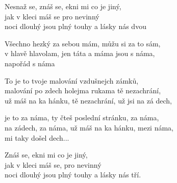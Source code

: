 
\ve{}
Nesnaž se, znáš se, ekni mi  co je jiný,\\
jak v kleci máš se pro nevinný \\
noci dlouhý jsou plný  touhy a lásky nás dvou

\ve{}
Všechno hezký za sebou mám,
můžu si  za to sám, \\
v hlavě  hlavolam, jen táta a máma jsou s  náma, \\
napořád s náma

\ve{}
To  je to tvoje malování vzdušnejch zámků,\\
malování po zdech holejma  rukama tě nezachrání, \\
už máš na ka hánku, tě nezachrání, už jsi na zá dech,

\ve{}
je to za náma, ty čteš poslední  stránku, za náma,\\
na  zádech, za náma, už máš na ka hánku, mezi náma,\\
mi taky došel dech...

\ve{}
Znáš se, ekni mi  co je jiný,\\
jak v kleci máš se, pro nevinný\\
noci dlouhý jsou plný touhy a lásky nás tří.

\esong{}